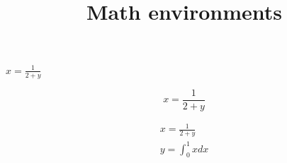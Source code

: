 \documentclass{article}
\title{Math environments}
\begin{document}
\maketitle

$x = \frac{1}{2+y}$

\begin{equation}
x = \frac{1}{2+y}
\end{equation}

\begin{eqnarray}
x = \frac{1}{2+y} \\
y = \int_0^1 x dx
\end{eqnarray}
\end{document}
